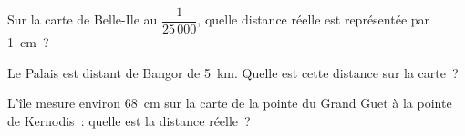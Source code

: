 \par
Sur la carte de Belle-Ile au $\dfrac1{25\,000}$, quelle distance réelle est représentée par 1~cm ?
\par Le Palais est distant de Bangor de 5~km. Quelle est cette distance sur la carte ?
\par L'île mesure environ 68~cm sur la carte de la pointe du Grand Guet à la pointe de Kernodis : quelle est la distance réelle ?